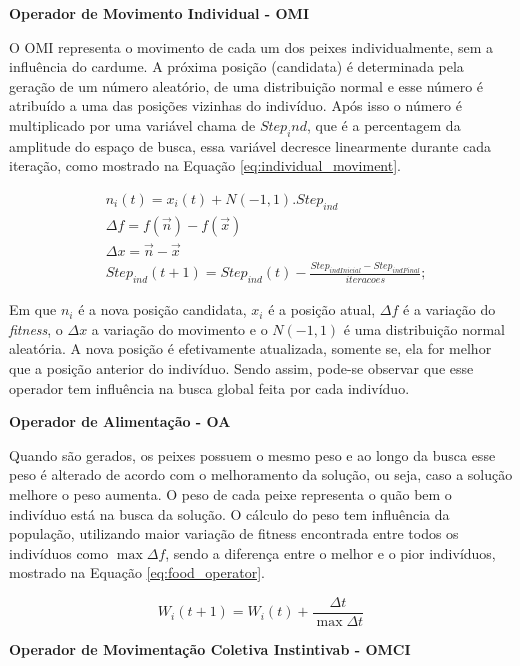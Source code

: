 \noindent \textbf{Operador de Movimento Individual - OMI}

O OMI representa o movimento de cada um dos peixes individualmente, sem a influência do cardume. A próxima posição (candidata) é determinada pela geração de um número aleatório, de uma distribuição normal e esse número é atribuído a uma das posições vizinhas do indivíduo. Após isso o número é multiplicado por uma variável chama de $Step_ind$, que é a percentagem da amplitude do espaço de busca, essa variável decresce linearmente durante cada iteração, como mostrado na Equação \ref{eq:individual_moviment}.

\begin{equation}
\label{eq:individual_moviment}
\begin{split}
& n_i(t) = x_i(t) + N(-1,1).Step_{ind} \\
& \Delta f = f(\vec{n}) - f(\vec{x}) \\
& \Delta x = \vec{n} - \vec{x} \\
& Step_{ind}(t+1) = Step_{ind}(t) - \frac{Step_{indInicial} - Step_{indFinal}}{iteracoes};
\end{split}
\end{equation}

\noindent Em que $n_i$ é a nova posição candidata, $x_i$ é a posição atual, $\Delta f$ é a variação do \textit{fitness}, o $\Delta x$ a variação do movimento e o $N(-1,1)$ é uma distribuição normal aleatória. A nova posição é efetivamente atualizada, somente se, ela for melhor que a posição anterior do indivíduo. Sendo assim, pode-se observar que esse operador tem influência na busca global feita por cada indivíduo.

\noindent \textbf{Operador de Alimentação - OA}

Quando são gerados, os peixes possuem o mesmo peso e ao longo da busca esse peso é alterado de acordo com o melhoramento da solução, ou seja, caso a solução melhore o peso aumenta. O peso de cada peixe representa o quão bem o indivíduo está na busca da solução. O cálculo do peso tem influência da população, utilizando maior variação de fitness encontrada entre todos os indivíduos como $\max{\Delta f}$, sendo a diferença entre o melhor e o pior indivíduos, mostrado na Equação \ref{eq:food_operator}.

\begin{equation}
\label{eq:food_operator}
W_i(t+1) = W_i(t) + \frac{\Delta t}{\max{\Delta t}}
\end{equation}

\noindent \textbf{Operador de Movimentação Coletiva Instintivab - OMCI}

